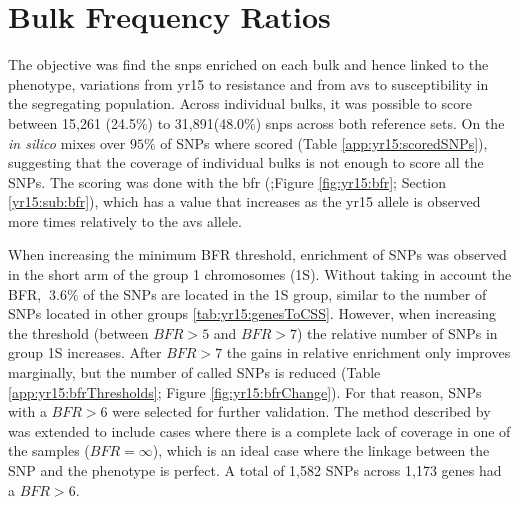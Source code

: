 \section{Bulk Frequency Ratios}
\label{sec:yr15:bfr}



The objective was find the \acrshort{snp}s enriched on each bulk and hence linked to the phenotype, variations from \acrshort{yr15} to resistance and from \acrshort{avs} to susceptibility in the segregating population. 
Across individual bulks, it was possible to score between 15,261 (24.5\%) to 31,891(48.0\%) \acrshort{snp}s across both reference sets.
On the \textit{in silico} mixes over $95\%$ of SNPs where scored (Table \ref{app:yr15:scoredSNPs}), suggesting that the coverage of individual bulks is not enough to score all the SNPs.  
The scoring was done with the \acrlong{bfr} (\citealt{Trick2012};Figure \ref{fig:yr15:bfr}; Section \ref{yr15:sub:bfr}), which has a value that increases as the \acrshort{yr15} allele is observed more times relatively to the \acrshort{avs} allele.



When increasing the minimum BFR threshold, enrichment of SNPs was observed in the short arm of the group 1 chromosomes (1S). 
Without taking in account the BFR, $~3.6\%$ of the SNPs are located in the 1S group, similar to the number of SNPs located in other groups \ref{tab:yr15:genesToCSS}. 
However, when increasing the threshold  (between $BFR > 5 $ and $BFR > 7$) the relative number of SNPs in group 1S increases. 
After $BFR>7$ the gains in relative enrichment only improves marginally, but the number of called SNPs is reduced (Table \ref{app:yr15:bfrThresholds}; Figure \ref{fig:yr15:bfrChange}).
For that reason, SNPs with a $BFR>6$ were selected for further validation. 
The method described by \citet{Trick2012} was extended to include cases where there is a complete lack of coverage in one of the samples ($BFR=\infty$), which is an ideal case where the linkage between the SNP and the phenotype is perfect. 
A total of 1,582 SNPs across 1,173 genes had a $BFR>6$.



